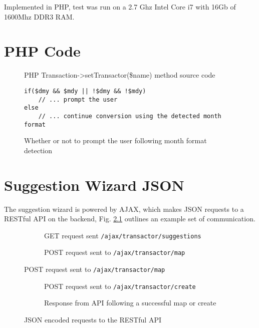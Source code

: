 \begin{appendices}
Implemented in PHP, test was run on a 2.7 Ghz Intel Core i7 with 16Gb of 1600Mhz DDR3 RAM.



\chapter{PHP Code} 

\begin{figure}

\caption{PHP Transaction->setTransactor(\$name) method source code}
\label{fig:settransactor}
\end{figure}

\begin{figure}
\lstset{style=phpcolor}
\begin{lstlisting}
if($dmy && $mdy || !$dmy && !$mdy)
    // ... prompt the user
else
    // ... continue conversion using the detected month format
\end{lstlisting}
\caption{Whether or not to prompt the user following month format detection}
\end{figure}
\chapter{Suggestion Wizard JSON}

The suggestion wizard is powered by AJAX, which makes JSON requests to a RESTful API on the backend, Fig. \ref{fig:json-examples} outlines an example set of communication.

\begin{figure}
    \begin{subfigure}[a]{\textwidth}
        
        \caption{GET request sent \lstinline{/ajax/transactor/suggestions}}
    \end{subfigure}
    
    \begin{subfigure}[b]{\textwidth}
        
        \caption{POST request sent to \lstinline{/ajax/transactor/map}}
    \end{subfigure}
\end{figure}

\begin{figure}
    \ContinuedFloat   
    \begin{subfigure}[c]{\textwidth}
        
        \caption{POST request sent to \lstinline{/ajax/transactor/create}}
    \end{subfigure}
    
    \begin{subfigure}[d]{\textwidth}
        
        \caption{Response from API following a successful map or create}
    \end{subfigure}    

    \caption{JSON encoded requests to the RESTful API}
    \label{fig:json-examples}
\end{figure}

\end{appendices}
